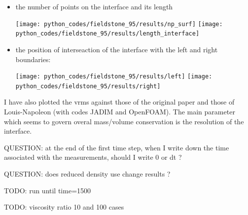 \begin{itemize}
\item the number of points on the interface
and its length 

\begin{center}
\texttt{[image: python\_codes/fieldstone\_95/results/np\_surf]}
\texttt{[image: python\_codes/fieldstone\_95/results/length\_interface]}
\end{center}

\item the position of interseaction of the interface with the left and right boundaries: 

\begin{center}
\texttt{[image: python\_codes/fieldstone\_95/results/left]}
\texttt{[image: python\_codes/fieldstone\_95/results/right]}
\end{center}

\end{itemize}






I have also plotted the vrms against those of the original paper and those of Louis-Napoleon \etal \cite{logb20}
(with codes JADIM and OpenFOAM). 
The main parameter which seems to govern overal mass/volume conservation is the resolution of the interface. 

QUESTION: at the end of the first time step, when I write down the time associated with the measurements, should I write 0
or dt ?

QUESTION: does reduced density use change results ?

TODO: run until time=1500

TODO: viscosity ratio 10 and 100 cases

